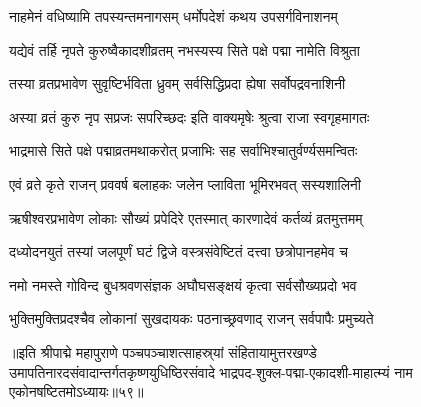 
\twolineshloka
{नाहमेनं वधिष्यामि तपस्यन्तमनागसम्}
{धर्मोपदेशं कथय उपसर्गविनाशनम्}%


\twolineshloka
{यद्येवं तर्हि नृपते कुरुष्वैकादशीव्रतम्}
{नभस्यस्य सिते पक्षे पद्मा नामेति विश्रुता}%

\twolineshloka
{तस्या व्रतप्रभावेण सुवृष्टिर्भविता ध्रुवम्}
{सर्वसिद्धिप्रदा ह्येषा सर्वोपद्रवनाशिनी}%

\twolineshloka
{अस्या व्रतं कुरु नृप सप्रजः सपरिच्छदः}
{इति वाक्यमृषेः श्रुत्वा राजा स्वगृहमागतः}%

\twolineshloka
{भाद्रमासे सिते पक्षे पद्माव्रतमथाकरोत्}
{प्रजाभिः सह सर्वाभिश्चातुर्वर्ण्यसमन्वितः}%

\twolineshloka
{एवं व्रते कृते राजन् प्रववर्ष बलाहकः}
{जलेन प्लाविता भूमिरभवत् सस्यशालिनी}%

\twolineshloka
{ऋषीश्वरप्रभावेण लोकाः सौख्यं प्रपेदिरे}
{एतस्मात् कारणादेवं कर्तव्यं व्रतमुत्तमम्}%

\twolineshloka
{दध्योदनयुतं तस्यां जलपूर्णं घटं द्विजे}
{वस्त्रसंवेष्टितं दत्त्वा छत्रोपानहमेव च}%

\twolineshloka
{नमो नमस्ते गोविन्द बुधश्रवणसंज्ञक}
{अघौघसङ्क्षयं कृत्वा सर्वसौख्यप्रदो भव}%

\twolineshloka
{भुक्तिमुक्तिप्रदश्चैव लोकानां सुखदायकः}
{पठनाच्छ्रवणाद् राजन् सर्वपापैः प्रमुच्यते}%

॥इति श्रीपाद्मे महापुराणे पञ्चपञ्चाशत्साहस्र्यां संहितायामुत्तरखण्डे उमापतिनारदसंवादान्तर्गतकृष्णयुधिष्ठिरसंवादे भाद्रपद-शुक्ल-पद्मा-एकादशी-माहात्म्यं नाम एकोनषष्टितमोऽध्यायः॥५९॥

\genMangalaShloka

\hyperref[sec:ekadashi_mahatmyam_padma_puranam]{\closesub}
\clearpage

